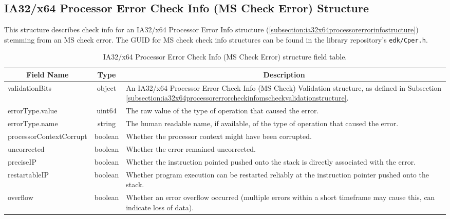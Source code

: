 \documentclass{report}
\newcommand*{\thead}[1]{\multicolumn{1}{|c|}{\bfseries #1}}
\newcommand*{\jsontable}[1]{
    \begin{table}[!ht]
    \label{#1}
    \centering
    \begin{adjustbox}{center}
    \begin{tabular}{|l|c|p{8cm}|}
    \hline
    \thead{Field Name} & \thead{Type} & \thead{Description} \\
    \hline
}
\newcommand*{\jsontableend}[1]{
    \hline
    \end{tabular}
    \end{adjustbox}
    \caption{#1}
    \label{table:#1}
    \end{table}
    \FloatBarrier
}
\begin{document}
\subsection{IA32/x64 Processor Error Check Info (MS Check Error) Structure}
\label{subsection:ia32x64processorerrorcheckinfomscheckstructure}
This structure describes check info for an IA32/x64 Processor Error Info structure (\ref{subsection:ia32x64processorerrorinfostructure}) stemming from an MS check error.
The GUID for MS check check info structures can be found in the library repository's \texttt{edk/Cper.h}.
\jsontable{table:ia32x64processorerrorcheckinfomscheckstructure}
validationBits & object & An IA32/x64 Processor Error Check Info (MS Check) Validation structure, as defined in Subsection \ref{subsection:ia32x64processorerrorcheckinfomscheckvalidationstructure}.\\
\hline
errorType.value & uint64 & The raw value of the type of operation that caused the error.\\
errorType.name & string & The human readable name, if available, of the type of operation that caused the error.\\
\hline
processorContextCorrupt & boolean & Whether the processor context might have been corrupted.\\
\hline
uncorrected & boolean & Whether the error remained uncorrected.\\
\hline
preciseIP & boolean & Whether the instruction pointed pushed onto the stack is directly associated with the error.\\
\hline
restartableIP & boolean & Whether program execution can be restarted reliably at the instruction pointer pushed onto the stack.\\
\hline
overflow & boolean & Whether an error overflow occurred (multiple errors within a short timeframe may cause this, can indicate loss of data).\\
\jsontableend{IA32/x64 Processor Error Check Info (MS Check Error) structure field table.}

\end{document}
